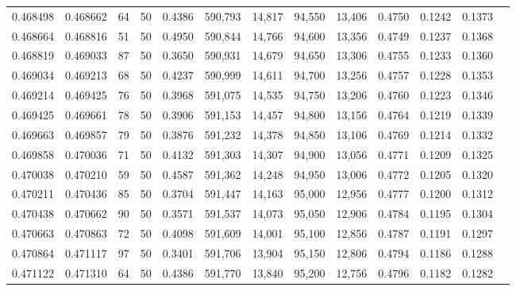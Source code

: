 \begin{tabular}{rrrrrrrrrrrrr}
0.468498 & 0.468662 &    64 &  50 &                                     0.4386 & 590,793 &  14,817 &  94,550 &  13,406 & 0.4750 & 0.1242 & 0.1373 \\
0.468664 & 0.468816 &    51 &  50 &                                     0.4950 & 590,844 &  14,766 &  94,600 &  13,356 & 0.4749 & 0.1237 & 0.1368 \\
0.468819 & 0.469033 &    87 &  50 &                                     0.3650 & 590,931 &  14,679 &  94,650 &  13,306 & 0.4755 & 0.1233 & 0.1360 \\
0.469034 & 0.469213 &    68 &  50 &                                     0.4237 & 590,999 &  14,611 &  94,700 &  13,256 & 0.4757 & 0.1228 & 0.1353 \\
0.469214 & 0.469425 &    76 &  50 &                                     0.3968 & 591,075 &  14,535 &  94,750 &  13,206 & 0.4760 & 0.1223 & 0.1346 \\
0.469425 & 0.469661 &    78 &  50 &                                     0.3906 & 591,153 &  14,457 &  94,800 &  13,156 & 0.4764 & 0.1219 & 0.1339 \\
0.469663 & 0.469857 &    79 &  50 &                                     0.3876 & 591,232 &  14,378 &  94,850 &  13,106 & 0.4769 & 0.1214 & 0.1332 \\
0.469858 & 0.470036 &    71 &  50 &                                     0.4132 & 591,303 &  14,307 &  94,900 &  13,056 & 0.4771 & 0.1209 & 0.1325 \\
0.470038 & 0.470210 &    59 &  50 &                                     0.4587 & 591,362 &  14,248 &  94,950 &  13,006 & 0.4772 & 0.1205 & 0.1320 \\
0.470211 & 0.470436 &    85 &  50 &                                     0.3704 & 591,447 &  14,163 &  95,000 &  12,956 & 0.4777 & 0.1200 & 0.1312 \\
0.470438 & 0.470662 &    90 &  50 &                                     0.3571 & 591,537 &  14,073 &  95,050 &  12,906 & 0.4784 & 0.1195 & 0.1304 \\
0.470663 & 0.470863 &    72 &  50 &                                     0.4098 & 591,609 &  14,001 &  95,100 &  12,856 & 0.4787 & 0.1191 & 0.1297 \\
0.470864 & 0.471117 &    97 &  50 &                                     0.3401 & 591,706 &  13,904 &  95,150 &  12,806 & 0.4794 & 0.1186 & 0.1288 \\
0.471122 & 0.471310 &    64 &  50 &                                     0.4386 & 591,770 &  13,840 &  95,200 &  12,756 & 0.4796 & 0.1182 & 0.1282 \\

\end{tabular}
